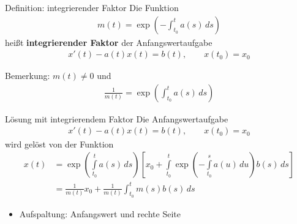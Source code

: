 \begin{frame}
  \begin{block}{Definition: integrierender Faktor}
    Die Funktion
    \begin{gather*}
      m(t) = \exp\left(-\int_{t_0}^t a(s)\,ds \right)
    \end{gather*}
    heißt \textbf{integrierender Faktor} der Anfangswertaufgabe
    \begin{gather*}
      x'(t) - a(t)x(t) = b(t),\qquad x(t_0) = x_0
    \end{gather*}
  \end{block}
  \pause
  Bemerkung: $m(t)\neq 0$ und
  \begin{gather*}
    \frac1{m(t)} = \exp\left(\int_{t_0}^t a(s)\,ds \right)
  \end{gather*}
\end{frame}

\begin{frame}
  \begin{block}{Lösung mit integrierendem Faktor}
    Die Anfangswertaufgabe
    \begin{gather*}
      x'(t) - a(t)x(t) = b(t),\qquad x(t_0) = x_0
    \end{gather*}
    wird gelöst von der Funktion
    \begin{align*}
      x(t)
      &= \exp\left({\scriptstyle\int\limits_{t_0}^t a(s)\,ds}\right)
        \left[
        x_0 + \int\limits_{t_0}^t \exp
        \left({\scriptstyle
        -\int\limits_{t_0}^s a(u)\,du
        }\right) b(s)\,ds
        \right]\\
      &= \frac1{m(t)} x_0 + \frac1{m(t)} \int_{t_0}^t m(s) b(s)\,ds
    \end{align*}
  \end{block}
  \pause
  \begin{itemize}
  \item Aufspaltung: Anfangswert und rechte Seite
  \end{itemize}
\end{frame}

